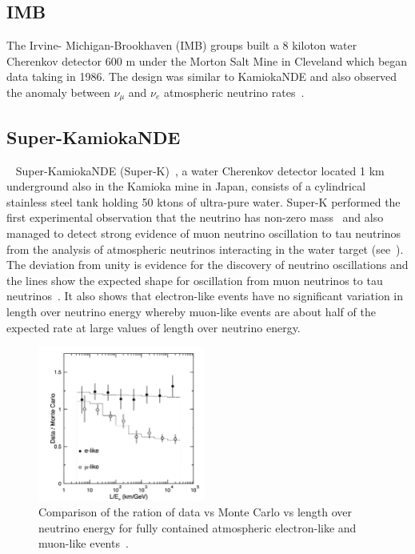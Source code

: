 \subsection{IMB}
The Irvine- Michigan-Brookhaven (IMB) groups built a 8 kiloton water Cherenkov detector 600 m under the Morton Salt Mine in Cleveland which began data taking in 1986. The design was similar to KamiokaNDE and also observed the anomaly between $\nu_\mu$ and $\nu_e$ atmospheric neutrino rates~\cite{60IMB}.


\subsection{Super-KamiokaNDE}~\label{subsection:Super-K}
Super-KamiokaNDE (Super-K)~\cite{20SUPERK}, a water Cherenkov detector located 1 km underground also in the Kamioka mine in Japan, consists of a cylindrical stainless steel tank holding 50 ktons of ultra-pure water. Super-K performed the first experimental observation that the neutrino has non-zero mass~\cite{10Fukuda} and also managed to detect strong evidence of muon neutrino oscillation to tau neutrinos from the analysis of atmospheric neutrinos interacting in the water target (see~). The deviation from unity is evidence for the discovery of neutrino oscillations and the lines show the expected shape for oscillation from muon neutrinos to tau neutrinos~\cite{10Fukuda}. It also shows that electron-like events have no significant variation in length over neutrino energy whereby muon-like events are about half of the expected rate at large values of length over neutrino energy.

\begin{figure}[h!]
\centering
  \centering
\includegraphics[width=0.49\textwidth]{figures/simuSK2.jpeg}
\vspace{2mm}
\caption{Comparison of the ration of data vs Monte Carlo vs length over neutrino energy for fully contained atmospheric electron-like and muon-like events~\cite{10Fukuda}.}
\label{fig:SK2}
\end{figure}

